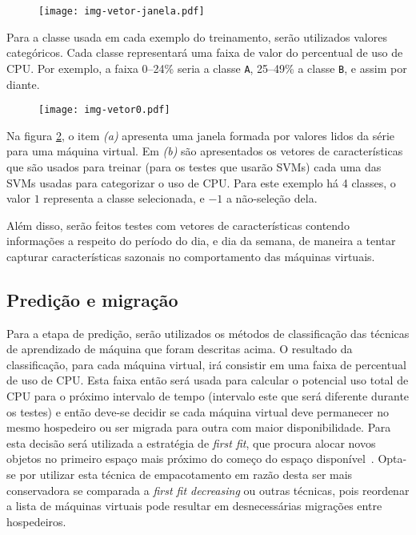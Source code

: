 \begin{figure}[htp]
\centering
\texttt{[image: img-vetor-janela.pdf]}
\label{fig:vetorjanela}
\end{figure}

Para a classe usada em cada exemplo do treinamento, serão utilizados
valores categóricos. Cada classe representará uma faixa de valor do
percentual de uso de CPU. Por exemplo, a faixa 0--24\% seria a classe
\texttt{A}, 25--49\% a classe \texttt{B}, e assim por diante.

\begin{figure}[htp]
\centering
\texttt{[image: img-vetor0.pdf]}
\label{fig:vetor0}
\end{figure}

Na figura \ref{fig:vetor0}, o item \emph{(a)} apresenta uma janela
formada por valores lidos da série para uma máquina virtual. Em \emph{(b)}
são apresentados os vetores de características que são usados para treinar
(para os testes que usarão SVMs) cada uma das SVMs usadas para categorizar
o uso de CPU. Para este exemplo há 4 classes, o valor $1$ representa a
classe selecionada, e $-1$ a não-seleção dela.

Além disso, serão feitos testes com vetores de características contendo
informações a respeito do período do dia, e dia da semana, de maneira a
tentar capturar características sazonais no comportamento das máquinas
virtuais.

\subsection{Predição e migração}

Para a etapa de predição, serão utilizados os métodos de classificação das
técnicas de aprendizado de máquina que foram descritas acima. O resultado da
classificação, para cada máquina virtual, irá consistir em uma faixa de
percentual de uso de CPU. Esta faixa então será usada para calcular o
potencial uso total de CPU para o próximo intervalo de tempo (intervalo este
que será diferente durante os testes) e então deve-se decidir se cada máquina
virtual deve permanecer no mesmo hospedeiro ou ser migrada para outra com maior
disponibilidade. Para esta decisão será utilizada a estratégia de \emph{first
fit}, que procura alocar novos objetos no primeiro espaço mais próximo do
começo do espaço disponível~\cite{yao1980new}. Opta-se por utilizar esta
técnica de empacotamento em razão desta ser mais conservadora se comparada a
\emph{first fit decreasing} ou outras técnicas, pois reordenar a lista de
máquinas virtuais pode resultar em desnecessárias migrações entre hospedeiros.

